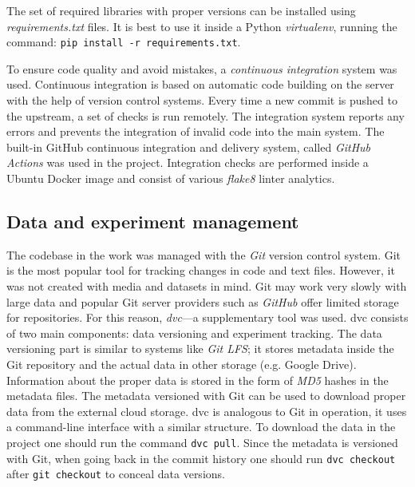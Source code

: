 The set of required libraries with proper versions can be installed using \textit{requirements.txt} files.
It is best to use it inside a Python \textit{virtualenv}, running the command: \texttt{pip install -r requirements.txt}.

To ensure code quality and avoid mistakes, a \textit{continuous integration} system was used.
Continuous integration is based on automatic code building on the server with the help of version control systems.
Every time a new commit is pushed to the upstream, a set of checks is run remotely.
The integration system reports any errors and prevents the integration of invalid code into the main system.
The built-in GitHub continuous integration and delivery system, called \textit{GitHub Actions} was used in the project.
Integration checks are performed inside a Ubuntu Docker image and consist of various \textit{flake8} linter analytics.

\subsection{Data and experiment management}
\label{sec:exp-management}
The codebase in the work was managed with the \textit{Git} version control system.
Git is the most popular tool for tracking changes in code and text files.
However, it was not created with media and datasets in mind.
Git may work very slowly with large data and popular Git server providers such as \textit{GitHub} offer limited storage for repositories.
For this reason, \textit{\gls{dvc}}---a supplementary tool was used.
\gls{dvc} consists of two main components: data versioning and experiment tracking.
The data versioning part is similar to systems like \textit{Git LFS}; it stores metadata inside the Git repository and the actual data in other storage (e.g. Google Drive).
Information about the proper data is stored in the form of \textit{MD5} hashes in the metadata files.
The metadata versioned with Git can be used to download proper data from the external cloud storage.
\gls{dvc} is analogous to Git in operation, it uses a command-line interface with a similar structure.
To download the data in the project one should run the command \texttt{dvc pull}.
Since the metadata is versioned with Git, when going back in the commit history one should run \texttt{dvc checkout} after \texttt{git checkout} to conceal data versions.

